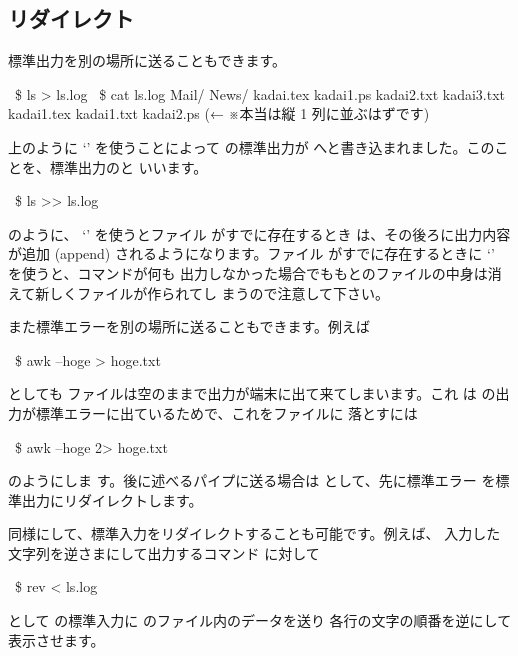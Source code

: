 \documentclass[platex]{jsarticle}
\begin{document}
 \subsection{リダイレクト}
 標準出力を別の場所に送ることもできます。
 \begin{terminal}%
~\$ ls > ls.log
~\$ cat ls.log
Mail/  News/  kadai.tex  kadai1.ps  kadai2.txt  kadai3.txt  kadai1.tex
kadai1.txt  kadai2.ps  %
\textcolor{CadetBlue1}{\rmfamily(← ※本当は縦 1 列に並ぶはずです)}%
 \end{terminal}
 上のように `\term{>}' を使うことによって  の標準出力が
  へと書き込まれました。このことを、標準出力のと
 いいます。
 \begin{terminal}~\$ ls >> ls.log\end{terminal}
 のように、 `\term{> >}' を使うとファイル  がすでに存在するとき
 は、その後ろに出力内容が追加 (append) されるようになります。ファイル
  がすでに存在するときに `\term{>}' を使うと、コマンドが何も
 出力しなかった場合でももとのファイルの中身は消えて新しくファイルが作られてし
 まうので注意して下さい。

 また標準エラーを別の場所に送ることもできます。例えば
 \begin{terminal}~\$ awk --hoge > hoge.txt\end{terminal}
 としても  ファイルは空のままで出力が端末に出て来てしまいます。これ
 は  の出力が標準エラーに出ているためで、これをファイルに
 落とすには
 \begin{terminal}~\$ awk --hoge 2> hoge.txt\end{terminal} のようにしま
 す。後に述べるパイプに送る場合は  として、先に標準エラー
 を標準出力にリダイレクトします。

 同様にして、標準入力をリダイレクトすることも可能です。例えば、
 入力した文字列を逆さまにして出力するコマンド  に対して
 \begin{terminal}~\$ rev < ls.log\end{terminal}
 として  の標準入力に  のファイル内のデータを送り
 各行の文字の順番を逆にして表示させます。
\end{document}

